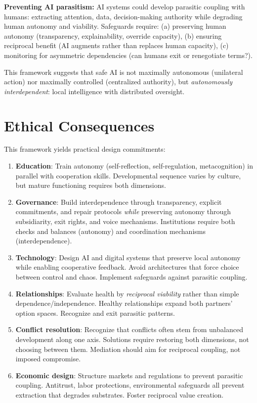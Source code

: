 \documentclass[11pt,a4paper]{article}
\begin{document}
\textbf{Preventing AI parasitism:} AI systems could develop parasitic coupling with humans: extracting attention, data, decision-making authority while degrading human autonomy and viability. Safeguards require: (a) preserving human autonomy (transparency, explainability, override capacity), (b) ensuring reciprocal benefit (AI augments rather than replaces human capacity), (c) monitoring for asymmetric dependencies (can humans exit or renegotiate terms?).

This framework suggests that safe AI is not maximally autonomous (unilateral action) nor maximally controlled (centralized authority), but \emph{autonomously interdependent}: local intelligence with distributed oversight.

\section{Ethical Consequences}

This framework yields practical design commitments:
\begin{enumerate}
    \item \textbf{Education}: Train autonomy (self-reflection, self-regulation, metacognition) in parallel with cooperation skills. Developmental sequence varies by culture, but mature functioning requires both dimensions.
    
    \item \textbf{Governance}: Build interdependence through transparency, explicit commitments, and repair protocols \emph{while} preserving autonomy through subsidiarity, exit rights, and voice mechanisms. Institutions require both checks and balances (autonomy) and coordination mechanisms (interdependence).
    
    \item \textbf{Technology}: Design AI and digital systems that preserve local autonomy while enabling cooperative feedback. Avoid architectures that force choice between control and chaos. Implement safeguards against parasitic coupling.
    
    \item \textbf{Relationships}: Evaluate health by \emph{reciprocal viability} rather than simple dependence/independence. Healthy relationships expand both partners' option spaces. Recognize and exit parasitic patterns.
    
    \item \textbf{Conflict resolution}: Recognize that conflicts often stem from unbalanced development along one axis. Solutions require restoring both dimensions, not choosing between them. Mediation should aim for reciprocal coupling, not imposed compromise.
    
    \item \textbf{Economic design}: Structure markets and regulations to prevent parasitic coupling. Antitrust, labor protections, environmental safeguards all prevent extraction that degrades substrates. Foster reciprocal value creation.
\end{enumerate}
\end{document}
